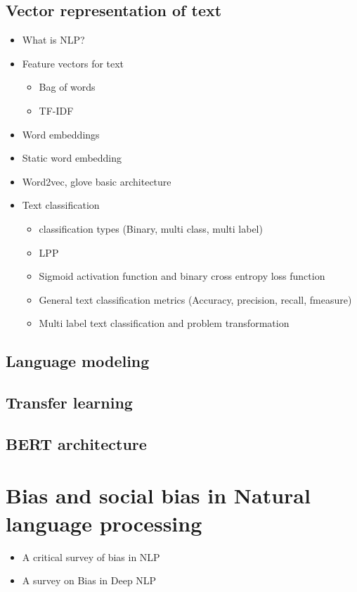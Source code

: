     \subsection{Vector representation of text}
    \begin{itemize}
        \item What is NLP?
        \item Feature vectors for text 
            \begin{itemize}
                \item Bag of words
                \item TF-IDF
            \end{itemize}
        \item Word embeddings
        \item Static word embedding
        \item Word2vec, glove basic architecture
        \item Text classification 
        \begin{itemize}
            \item classification types (Binary, multi class, multi label)
            \item LPP
            \item Sigmoid activation function and binary cross entropy loss function
            \item General text classification metrics (Accuracy, precision, recall, fmeasure)
            \item Multi label text classification and problem transformation 
        \end{itemize}
    \end{itemize}
    \subsection{Language modeling}
    \subsection{Transfer learning}
    \subsection{BERT architecture}
\section{Bias and social bias in Natural language processing}
\begin{itemize}
    \item A critical survey of bias in NLP \cite{blodgett2020language}
    \item A survey on Bias in Deep NLP \cite{garrido2021survey}
\end{itemize}